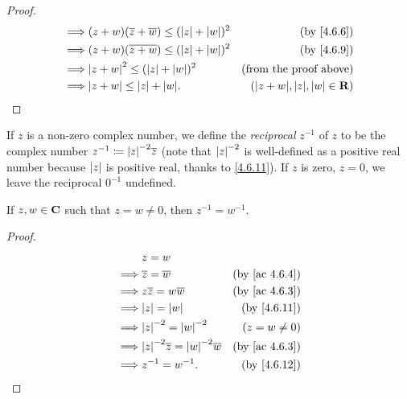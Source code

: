 \begin{proof}
\begin{align*}
    \implies & (z + w) (\overline{z} + \overline{w}) \leq (\abs{z} + \abs{w})^2                                       & \text{(by \cref{4.6.6})}               \\
    \implies & (z + w) (\overline{z + w}) \leq (\abs{z} + \abs{w})^2                                                  & \text{(by \cref{4.6.9})}               \\
    \implies & \abs{z + w}^2 \leq (\abs{z} + \abs{w})^2                                                               & \text{(from the proof above)}          \\
    \implies & \abs{z + w} \leq \abs{z} + \abs{w}.                                                                    & (\abs{z + w}, \abs{z}, \abs{w} \in \R)
  \end{align*}
\end{proof}

\begin{definition}\label{4.6.12}
  If \(z\) is a non-zero complex number, we define the \emph{reciprocal} \(z^{-1}\) of \(z\) to be the complex number \(z^{-1} \coloneqq \abs{z}^{-2} \overline{z}\)
  (note that \(\left\lvert z\right\rvert^{-2}\) is well-defined as a positive real number because \(\left\lvert z\right\rvert\) is positive real, thanks to \cref{4.6.11}).
  If \(z\) is zero, \(z = 0\), we leave the reciprocal \(0^{-1}\) undefined.
\end{definition}

\begin{additional corollary}\label{ac 4.6.5}
If \(z, w \in \mathbf{C}\) such that \(z = w \neq 0\), then \(z^{-1} = w^{-1}\).
\end{additional corollary}

\begin{proof}
  \begin{align*}
             & z = w                                                                               \\
    \implies & \overline{z} = \overline{w}                           & \text{(by \cref{ac 4.6.4})} \\
    \implies & z \overline{z} = w \overline{w}                       & \text{(by \cref{ac 4.6.3})} \\
    \implies & \abs{z} = \abs{w}                                     & \text{(by \cref{4.6.11})}   \\
    \implies & \abs{z}^{-2} = \abs{w}^{-2}                           & (z = w \neq 0)              \\
    \implies & \abs{z}^{-2} \overline{z} = \abs{w}^{-2} \overline{w} & \text{(by \cref{ac 4.6.3})} \\
    \implies & z^{-1} = w^{-1}.                                      & \text{(by \cref{4.6.12})}
  \end{align*}
\end{proof}

